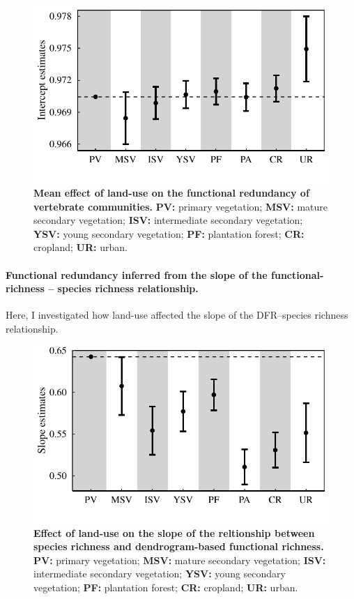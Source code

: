 \begin{figure}[h!]
\centering
\includegraphics[scale=0.70]{figures/chapter3/FRedundancy/Mean_effect_LU}
\caption[Mean effect of land-use on the functional redundancy of vertebrate communities]{\textbf{Mean effect of land-use on the functional redundancy of vertebrate communities.} \textbf{PV:} primary vegetation; \textbf{MSV:} mature secondary vegetation; \textbf{ISV:} intermediate secondary vegetation; \textbf{YSV:} young secondary vegetation; \textbf{PF:} plantation forest; \textbf{CR:} cropland; \textbf{UR:} urban.}
\label{LU_mean_FRic}
\end{figure}

\paragraph{Functional redundancy inferred from the slope of the functional-richness -- species richness relationship.}
Here, I investigated how land-use affected the slope of the DFR--species richness relationship. 

\begin{figure}[h!]
\centering
\includegraphics[scale=0.70]{figures/chapter3/DFR/Mean_effect}
\caption[Effect of land-use on the slope of the reltionship between species richness and dendrogram-based functional richness]{\textbf{Effect of land-use on the slope of the reltionship between species richness and dendrogram-based functional richness.} \textbf{PV:} primary vegetation; \textbf{MSV:} mature secondary vegetation; \textbf{ISV:} intermediate secondary vegetation; \textbf{YSV:} young secondary vegetation; \textbf{PF:} plantation forest; \textbf{CR:} cropland; \textbf{UR:} urban.}
\label{LU_mean_FRic}
\end{figure}

